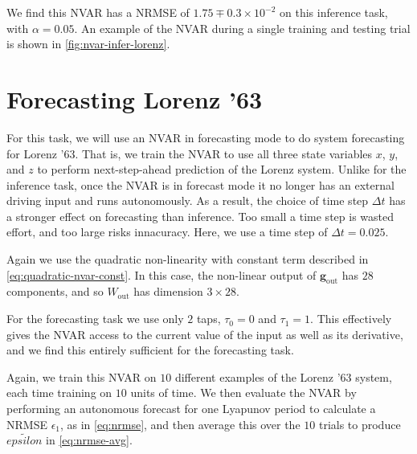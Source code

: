We find this NVAR has a NRMSE of $1.75\mp0.3\times10^{-2}$ on this
inference task, with $\alpha = 0.05$. An example of the NVAR during a
single training and testing trial is shown in
\cref{fig:nvar-infer-lorenz}.

\section{Forecasting Lorenz '63}

For this task, we will use an NVAR in forecasting mode to do system
forecasting for Lorenz '63. That is, we train the NVAR to use all
three state variables $x$, $y$, and $z$ to perform next-step-ahead
prediction of the Lorenz system. Unlike for the inference task, once
the NVAR is in forecast mode it no longer has an external driving
input and runs autonomously. As a result, the choice of time step
$\Delta t$ has a stronger effect on forecasting than inference. Too
small a time step is wasted effort, and too large risks
innacuracy. Here, we use a time step of $\Delta t = 0.025$.

Again we use the quadratic non-linearity with constant term described
in \cref{eq:quadratic-nvar-const}. In this case, the non-linear output
of $\bm{g}_\text{out}$ has $28$ components, and so $W_\text{out}$ has
dimension $3 \times 28$.

For the forecasting task we use only $2$ taps, $\tau_0 = 0$ and
$\tau_1 = 1$. This effectively gives the NVAR access to the current
value of the input as well as its derivative, and we find this
entirely sufficient for the forecasting task.

Again, we train this NVAR on $10$ different examples of the Lorenz '63
system, each time training on $10$ units of time. We then evaluate the
NVAR by performing an autonomous forecast for one Lyapunov period to
calculate a NRMSE $\epsilon_1$, as in \cref{eq:nrmse}, and then
average this over the $10$ trials to produce $\tilde{epsilon}$ in
\cref{eq:nrmse-avg}.

